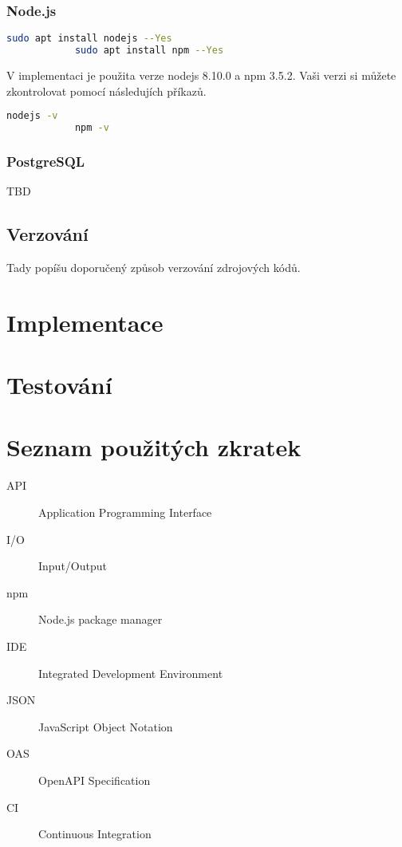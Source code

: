 \documentclass[thesis=B,czech]{FITthesis}[2012/06/26]
\begin{document}
        \subsection{Node.js}
            \begin{lstlisting}[language=bash,caption={Instalace Node.js a npm}]
            sudo apt install nodejs --Yes
            sudo apt install npm --Yes
            \end{lstlisting}
            V implementaci je použita verze nodejs 8.10.0 a npm 3.5.2. Vaši verzi si můžete zkontrolovat pomocí následujích příkazů.
            \begin{lstlisting}[language=bash,caption={Zkontrolování verze Node.js a npm}]
            nodejs -v
            npm -v
            \end{lstlisting}
        \subsection{PostgreSQL}
            TBD
    \section{Verzování}
        Tady popíšu doporučený způsob verzování zdrojových kódů.

\chapter{Implementace}

\chapter{Testování}

\begin{conclusion}
\end{conclusion}




\appendix

\chapter{Seznam použitých zkratek}
\begin{description}
	\item[API] Application Programming Interface
	\item[I/O] Input/Output
	\item[npm] Node.js package manager
	\item[IDE] Integrated Development Environment
	\item[JSON] JavaScript Object Notation
	\item[OAS] OpenAPI Specification
	\item[CI] Continuous Integration
\end{description}
\end{document}
